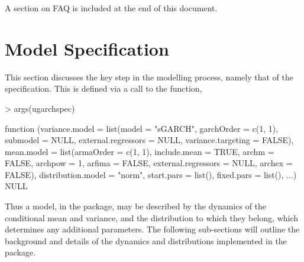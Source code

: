 A section on FAQ is included at the end of this document.
\section{Model Specification}
This section discusses the key step in the modelling process, namely that of the
specification. This is defined via a call to the \verb@ugarchspec@ function,
\begin{Schunk}
\begin{Sinput}
> args(ugarchspec)
\end{Sinput}
\begin{Soutput}
function (variance.model = list(model = "sGARCH", garchOrder = c(1,
    1), submodel = NULL, external.regressors = NULL, variance.targeting = FALSE),
    mean.model = list(armaOrder = c(1, 1), include.mean = TRUE,
        archm = FALSE, archpow = 1, arfima = FALSE, external.regressors = NULL,
        archex = FALSE),
    distribution.model = "norm", start.pars = list(), fixed.pars = list(),
    ...)
NULL
\end{Soutput}
\end{Schunk}
Thus a model, in the \verb@rugarch@ package, may be described by the dynamics of
the conditional mean and variance, and the distribution to which they belong,
which determines any additional parameters. The following sub-sections will
outline the background and details of the dynamics and distributions implemented
in the package.

